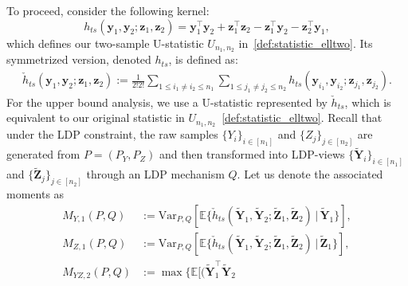 \documentclass[twoside,11pt]{article}
\newcommand{\rvTwo}{Y}
\newcommand{\rvThree}{Z}
\newcommand{\vectorize}[1]{\mathbf{#1}}
\newcommand{\private}[1]{\tilde{#1}}
\newcommand{\rvY}{Y}
\newcommand{\vecRandomPrivTwoSampleYNumber}[1]{\tilde{\mathbf{Y}}_{#1}}
\newcommand{\rvZ}{Z}
\newcommand{\rVecZ}{\vectorize{\rvZ}}
\newcommand{\rVecZPriv}{\tilde{\rVecZ}} %
\newcommand{\mE}{\mathbb{E}} %
\newcommand{\mVPQ}{\mathrm{Var}_{P,Q}} %
\newcommand{\sampleIndexOne}{i}
\newcommand{\sampleIndexTwo}{j}
\newcommand{\sampleSets}[3]{\{{#1}_{#2}\}_{#2 \in [#3]}}
\newcommand{\sampleSize}{n}
\newcommand{\kernelMoment}{M} %
\newcommand{\dataGenDist}{P}  %
\newcommand{\privacyMechanism}{Q}
\newcommand{\momentTwosampleVarCondexpY}{\kernelMoment_{\rvTwo,1}(\dataGenDist, \privacyMechanism)}
\newcommand{\momentTwosampleVarCondexpZ}{\kernelMoment_{\rvThree,1}(\dataGenDist, \privacyMechanism)}
\newcommand{\momentTwosampleExpSquare}{\kernelMoment_{\rvTwo \rvThree,2}(\dataGenDist, \privacyMechanism)}
\newcommand{\vecRandomPrivTwoSampleZNumber}[1]{\tilde{\mathbf{Z}}_{#1}}
\newcommand{\kernelTwoSample}{h_{ts}}
\newcommand{\kernelTwoSampleSym}{\check{h}_{ts}}
\begin{document}
\begin{appendix}
	To proceed, consider the following kernel:
	\begin{equation}\label{equation:twosample_kernel}
		h_{ts}(\vectorize{y}_1, \vectorize{y}_2; \vectorize{z}_1,\vectorize{z}_2) = \vectorize{y}_1^\top \vectorize{y}_2 + \vectorize{z}_1^\top \vectorize{z}_2 - \vectorize{z}_1^\top \vectorize{y}_2 - \vectorize{z}_2^\top \vectorize{y}_1,
	\end{equation}
	which defines our two-sample U-statistic $U_{\sampleSize_1,\sampleSize_2}$ in~\eqref{def:statistic_elltwo}.
	Its symmetrized version, denoted $h_{ts}$, is defined as: 
	\begin{align*}
		\kernelTwoSampleSym(\vectorize{y}_1,\vectorize{y}_2;\vectorize{z}_1,\vectorize{z}_2
		) := 
		\frac{1}{2!2!}
		\sum_{1 \leq i_1 \neq  i_2 \leq n_1}
		\sum_{1 \leq j_1 \neq  j_2 \leq n_2}
		\kernelTwoSample(\vectorize{y}_{i_1}, \vectorize{y}_{i_2}; \vectorize{z}_{j_1}, \vectorize{z}_{j_2}
		).
	\end{align*}
	For the upper bound analysis, we use a U-statistic represented by $\kernelTwoSampleSym$, which is equivalent to our original statistic in $U_{\sampleSize_1,\sampleSize_2}$~\eqref{def:statistic_elltwo}.
	Recall that under the LDP constraint, the raw samples
	$\sampleSets{\rvY}{\sampleIndexOne}{\sampleSize_1}$
	and
	$\sampleSets{\rvZ}{\sampleIndexTwo}{\sampleSize_2}$
	are generated from $P = (P_\rvY, P_\rvZ)$ and then transformed into LDP-views
	$\sampleSets{\tilde{\vectorize{\rvTwo}}}{\sampleIndexOne}{\sampleSize_1}$
	and
	$\sampleSets{\rVecZPriv}{\sampleIndexTwo}{\sampleSize_2}$
	through an LDP mechanism $Q$.
	Let us denote the associated moments as
	\begin{align*}
		\momentTwosampleVarCondexpY
		&:=
		\mVPQ[\mE\{ \kernelTwoSampleSym (
		\tilde{\vectorize{\rvTwo}}_1,
		\vecRandomPrivTwoSampleYNumber{2}
		;
		\vecRandomPrivTwoSampleZNumber{1},
		\vecRandomPrivTwoSampleZNumber{2}
		)
		\,|\,
		\tilde{\vectorize{\rvTwo}}_1
		\}],
		\\[.5em]
		\momentTwosampleVarCondexpZ
		&:= 
		\mVPQ[\mE\{ \kernelTwoSampleSym (
		\tilde{\vectorize{\rvTwo}}_1,
		\vecRandomPrivTwoSampleYNumber{2}
		;
		\vecRandomPrivTwoSampleZNumber{1},
		\vecRandomPrivTwoSampleZNumber{2}
		)
		\,|\,
		\vecRandomPrivTwoSampleZNumber{1}
		\}],%
		\\[.5em]
		\momentTwosampleExpSquare
		&:=
		\max
		\{
		\mE[
		(
		\private{\vectorize{\rvTwo}}_1^\top 
		\vecRandomPrivTwoSampleYNumber{2}

\end{align*}
\end{appendix}
\end{document}
